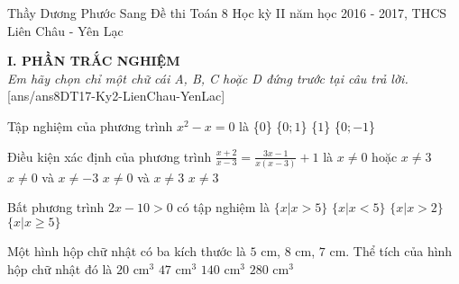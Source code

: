 \begin{name}
{Thầy Dương Phước Sang}
{Đề thi Toán 8 Học kỳ II năm học 2016 - 2017, THCS Liên Châu - Yên Lạc}
\end{name}
\noindent\textbf{I. PHẦN TRẮC NGHIỆM}\\
\textit{Em hãy chọn chỉ một chữ cái A, B, C hoặc D đứng trước tại câu trả lời.}
\setcounter{ex}{0}
[ans/ans8DT17-Ky2-LienChau-YenLac]
\begin{ex}%
	Tập nghiệm của phương trình $x^2-x=0$ là
	\choice
	{\{$0$\}}
	{\True \{$0;1$\}}
	{\{$1$\}}
	{\{$0;-1$\}}
\end{ex}
\begin{ex}%
	Điều kiện xác định của phương trình $\displaystyle\frac{x+2}{x-3}=\displaystyle\frac{3x-1}{x(x-3)}+1$ là
	\choice
	{$x \ne 0$ hoặc $x \ne 3$}
	{$x \ne 0$ và $x \ne -3$}
	{\True $x \ne 0$ và $x \ne 3$}
	{$x \ne 3$}
\end{ex}
\begin{ex}%
	Bất phương trình $2x-10>0$ có tập nghiệm là
	\choice
	{\True $\{x|x>5\}$}
	{$\{x|x<5\}$}
	{$\{x|x>2\}$}
	{$\{x|x \geq 5\}$}
\end{ex}
\begin{ex}%
	Một hình hộp chữ nhật có ba kích thước là $5$ cm, $8$ cm, $7$ cm. Thể tích của hình hộp chữ nhật đó là
	\choice
	{$20$ cm$^3$}
	{$47$ cm$^3$}
	{$140$ cm$^3$}
	{\True $280$ cm$^3$}
\end{ex}
